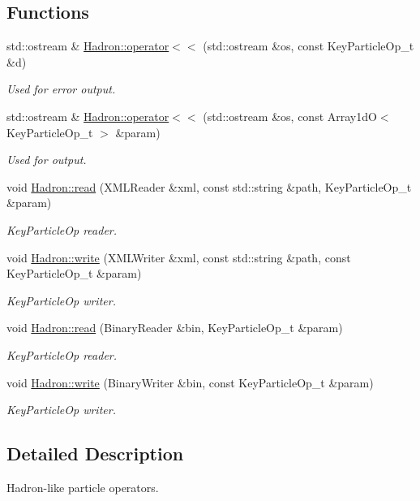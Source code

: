 \subsection*{Functions}
\begin{DoxyCompactItemize}
\item 
std\+::ostream \& \mbox{\hyperlink{namespaceHadron_a1a1ad3c7b1e45f6635516f9f1fcd2684}{Hadron\+::operator$<$$<$}} (std\+::ostream \&os, const Key\+Particle\+Op\+\_\+t \&d)
\begin{DoxyCompactList}\small\item\em Used for error output. \end{DoxyCompactList}\item 
std\+::ostream \& \mbox{\hyperlink{namespaceHadron_a815bc759a8acf71f5194f582a963f3f7}{Hadron\+::operator$<$$<$}} (std\+::ostream \&os, const Array1dO$<$ Key\+Particle\+Op\+\_\+t $>$ \&param)
\begin{DoxyCompactList}\small\item\em Used for output. \end{DoxyCompactList}\item 
void \mbox{\hyperlink{namespaceHadron_aa490647cc42691054f51d9885e6ec91c}{Hadron\+::read}} (X\+M\+L\+Reader \&xml, const std\+::string \&path, Key\+Particle\+Op\+\_\+t \&param)
\begin{DoxyCompactList}\small\item\em Key\+Particle\+Op reader. \end{DoxyCompactList}\item 
void \mbox{\hyperlink{namespaceHadron_a1aaa6594011475e4142807cfbf0b78e9}{Hadron\+::write}} (X\+M\+L\+Writer \&xml, const std\+::string \&path, const Key\+Particle\+Op\+\_\+t \&param)
\begin{DoxyCompactList}\small\item\em Key\+Particle\+Op writer. \end{DoxyCompactList}\item 
void \mbox{\hyperlink{namespaceHadron_a22ce4d5ec6f9bf7a3504cb4b7b176c78}{Hadron\+::read}} (Binary\+Reader \&bin, Key\+Particle\+Op\+\_\+t \&param)
\begin{DoxyCompactList}\small\item\em Key\+Particle\+Op reader. \end{DoxyCompactList}\item 
void \mbox{\hyperlink{namespaceHadron_a4330be9331eb4c839e7e123f5306560b}{Hadron\+::write}} (Binary\+Writer \&bin, const Key\+Particle\+Op\+\_\+t \&param)
\begin{DoxyCompactList}\small\item\em Key\+Particle\+Op writer. \end{DoxyCompactList}\end{DoxyCompactItemize}


\subsection{Detailed Description}
Hadron-\/like particle operators. 


